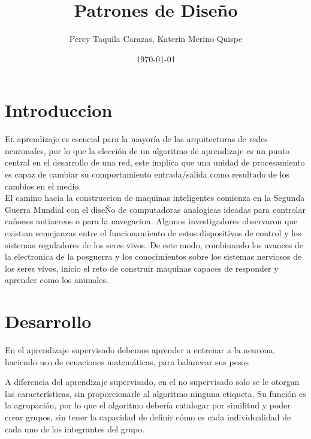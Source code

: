 \documentclass[twoside,twocolumn]{article}
\title{Patrones de Diseño}
\author{Percy Taquila Carazas, Katerin Merino Quispe}
\date{\today}
\begin{document}
\maketitle


\section{Introduccion}

\lettrine[nindent=0em,lines=3]{E}l aprendizaje es esencial para la mayoría de las arquitecturas de redes neuronales, por lo que la elección de un algoritmo de aprendizaje es un punto central en el desarrollo de una red, este implica que una unidad de procesamiento es capaz de cambiar su comportamiento entrada/salida
como resultado de los cambios en el medio.\\

El camino hacia la construccion de maquinas inteligentes comienza en la Segunda Guerra Mundial con el diseÑo de computadoras analogicas ideadas para controlar cañones antiaereos o para la navegacion.
Algunos investigadores observaron que existıan semejanzas entre el funcionamiento de estos dispositivos de control y los sistemas reguladores de los seres vivos. De este modo, combinando los avances de la electronica de la posguerra y los conocimientos sobre los sistemas nerviosos de los seres vivos, inicio el reto de construir maquinas capaces de responder y aprender como los animales.






\section{Desarrollo}
En el aprendizaje supervisado debemos aprender a entrenar a la neurona, haciendo uso de ecuaciones matemáticas, para balancear sus pesos

A diferencia del aprendizaje supervisado, en el no supervisado solo se le otorgan las características, sin proporcionarle al algoritmo ninguna etiqueta. Su función es la agrupación, por lo que el algoritmo debería catalogar por similitud y poder crear grupos, sin tener la capacidad de definir cómo es cada individualidad de cada uno de los integrantes del grupo.
\end{document}
